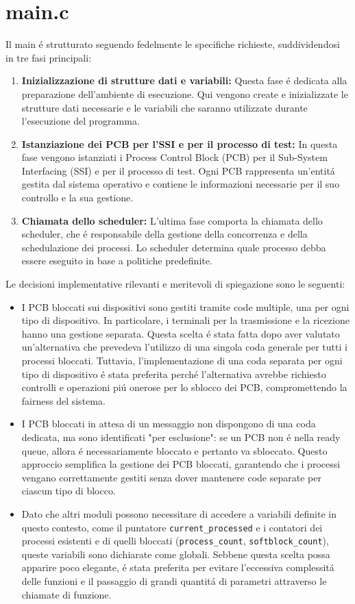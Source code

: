 \documentclass[a4paper]{article}
\begin{document}
\section{main.c}
Il main \'e strutturato seguendo fedelmente le specifiche richieste, suddividendosi in tre fasi principali:\begin{enumerate}
	\item \textbf{Inizializzazione di strutture dati e variabili:} Questa fase \'e dedicata alla preparazione dell'ambiente di esecuzione. Qui vengono create e inizializzate le strutture dati necessarie e le variabili che saranno utilizzate durante l'esecuzione del programma.
  \item \textbf{Istanziazione dei PCB per l’SSI e per il processo di test:} In questa fase vengono istanziati i Process Control Block (PCB) per il Sub-System Interfacing (SSI) e per il processo di test. Ogni PCB rappresenta un'entit\'a gestita dal sistema operativo e contiene le informazioni necessarie per il suo controllo e la sua gestione.
  \item \textbf{Chiamata dello scheduler:} L'ultima fase comporta la chiamata dello scheduler, che \'e responsabile della gestione della concorrenza e della schedulazione dei processi. Lo scheduler determina quale processo debba essere eseguito in base a politiche predefinite.
\end{enumerate}
Le decisioni implementative rilevanti e meritevoli di spiegazione sono le seguenti:
\begin{itemize}  
	\item I PCB bloccati sui dispositivi sono gestiti tramite code multiple, una per ogni tipo di dispositivo. In particolare, i terminali per la trasmissione e la ricezione hanno una gestione separata. Questa scelta \'e stata fatta dopo aver valutato un'alternativa che prevedeva l'utilizzo di una singola coda generale per tutti i processi bloccati. Tuttavia, l'implementazione di una coda separata per ogni tipo di dispositivo \'e stata preferita perché l'alternativa avrebbe richiesto controlli e operazioni pi\'u onerose per lo sblocco dei PCB, compromettendo la fairness del sistema.
	\item I PCB bloccati in attesa di un messaggio non dispongono di una coda dedicata, ma sono identificati "per esclusione": se un PCB non \'e nella ready queue, allora \'e necessariamente bloccato e pertanto va sbloccato. Questo approccio semplifica la gestione dei PCB bloccati, garantendo che i processi vengano correttamente gestiti senza dover mantenere code separate per ciascun tipo di blocco.
	\item Dato che altri moduli possono necessitare di accedere a variabili definite in questo contesto, come il puntatore \verb+current_processed+ e i contatori dei processi esistenti e di quelli bloccati (\verb+process_count+, \verb+softblock_count+), queste variabili sono dichiarate come globali. Sebbene questa scelta possa apparire poco elegante, \'e stata preferita per evitare l'eccessiva complessit\'a delle funzioni e il passaggio di grandi quantit\'a di parametri attraverso le chiamate di funzione.
\end{itemize}
\end{document}
